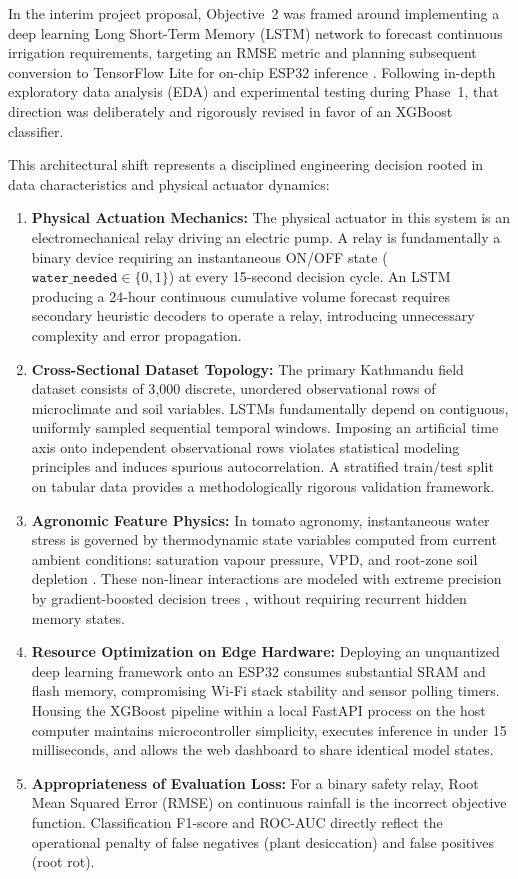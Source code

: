 \documentclass[12pt, a4paper]{article}
\begin{document}
In the interim project proposal, Objective~2 was framed around implementing a deep learning Long Short-Term Memory (LSTM) network to forecast continuous irrigation requirements, targeting an RMSE metric and planning subsequent conversion to TensorFlow Lite for on-chip ESP32 inference \citep{meng2023}. Following in-depth exploratory data analysis (EDA) and experimental testing during Phase~1, that direction was deliberately and rigorously revised in favor of an XGBoost classifier.

This architectural shift represents a disciplined engineering decision rooted in data characteristics and physical actuator dynamics:

\begin{enumerate}[leftmargin=1.2cm, itemsep=3pt]
    \item \textbf{Physical Actuation Mechanics:} The physical actuator in this system is an electromechanical relay driving an electric pump. A relay is fundamentally a binary device requiring an instantaneous ON/OFF state ($\texttt{water\_needed} \in \{0, 1\}$) at every 15-second decision cycle. An LSTM producing a 24-hour continuous cumulative volume forecast requires secondary heuristic decoders to operate a relay, introducing unnecessary complexity and error propagation.
    \item \textbf{Cross-Sectional Dataset Topology:} The primary Kathmandu field dataset consists of 3{,}000 discrete, unordered observational rows of microclimate and soil variables. LSTMs fundamentally depend on contiguous, uniformly sampled sequential temporal windows. Imposing an artificial time axis onto independent observational rows violates statistical modeling principles and induces spurious autocorrelation. A stratified train/test split on tabular data provides a methodologically rigorous validation framework.
    \item \textbf{Agronomic Feature Physics:} In tomato agronomy, instantaneous water stress is governed by thermodynamic state variables computed from current ambient conditions: saturation vapour pressure, VPD, and root-zone soil depletion \citep{allen1998}. These non-linear interactions are modeled with extreme precision by gradient-boosted decision trees \citep{chen2020xgboost}, without requiring recurrent hidden memory states.
    \item \textbf{Resource Optimization on Edge Hardware:} Deploying an unquantized deep learning framework onto an ESP32 consumes substantial SRAM and flash memory, compromising Wi-Fi stack stability and sensor polling timers. Housing the XGBoost pipeline within a local FastAPI process on the host computer maintains microcontroller simplicity, executes inference in under 15 milliseconds, and allows the web dashboard to share identical model states.
    \item \textbf{Appropriateness of Evaluation Loss:} For a binary safety relay, Root Mean Squared Error (RMSE) on continuous rainfall is the incorrect objective function. Classification F1-score and ROC-AUC directly reflect the operational penalty of false negatives (plant desiccation) and false positives (root rot). 
\end{enumerate}
\end{document}

